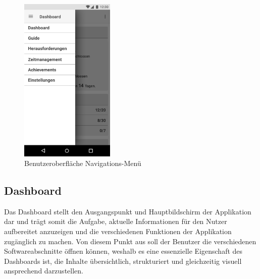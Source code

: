 \documentclass[bibliography=totoc,listof=totoc,BCOR=5mm,DIV=12,oneside]{scrbook}
\begin{document}
\begin{figure}[H]
	\centering
	\includegraphics[width=0.4\textwidth,keepaspectratio]{Bilder/Prototyp/Menu.png}
	\caption{Benutzeroberfläche Navigations-Menü}
	\label{img:navigation}
\end{figure}

\newpage
\subsection{Dashboard}
\par Das Dashboard stellt den Ausgangspunkt und Hauptbildschirm der Applikation dar und trägt somit die Aufgabe, aktuelle Informationen für den Nutzer aufbereitet anzuzeigen und die verschiedenen Funktionen der Applikation zugänglich zu machen. Von diesem Punkt aus soll der Benutzer die verschiedenen Softwareabschnitte öffnen können, weshalb es eine essenzielle Eigenschaft des Dashboards ist, die Inhalte übersichtlich, strukturiert und gleichzeitig visuell ansprechend darzustellen.
\end{document}

